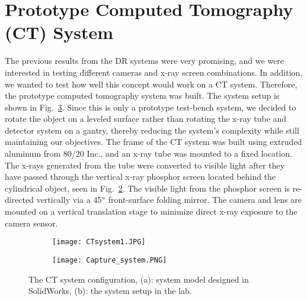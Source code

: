 \section{Prototype Computed Tomography (CT) System}
The previous results from the DR systems were very promising, and we were interested in testing different cameras and x-ray screen combinations.  In addition, we wanted to test how well this concept would work on a CT system.  Therefore, the prototype computed tomography system was built.  The system setup is shown in Fig.~\ref{fig:CTsystem}.  Since this is only a prototype test-bench system, we decided to rotate the object on a leveled surface rather than rotating the x-ray tube and detector system on a gantry, thereby reducing the system's complexity while still maintaining our objectives.  The frame of the CT system was built using extruded aluminum from 80/20 Inc., and an x-ray tube was mounted to a fixed location.  The x-rays generated from the tube were converted to visible light after they have passed through the vertical x-ray phosphor screen located behind the cylindrical object, seen in Fig.~\ref{fig:CTlab}.  The visible light from the phosphor screen is re-directed vertically via a 45$\degree$ front-surface folding mirror.  The camera and lens are mounted on a vertical translation stage to minimize direct x-ray exposure to the camera sensor.

\begin{figure}[h]
	\begin{subfigure}[b]{0.45\linewidth}
	\centering
	\texttt{[image: CTsystem1.JPG]}
	\caption{}
	\label{fig:CTmodel}
	\end{subfigure}
\hspace{1 cm}
	\begin{subfigure}[b]{0.45\linewidth}
	\centering
	\texttt{[image: Capture\_system.PNG]}
	\caption{}
	\label{fig:CTlab}
	\end{subfigure}
\caption{The CT system configuration, (a): system model designed in SolidWorks, (b): the system setup in the lab.}
\label{fig:CTsystem}
\end{figure}

